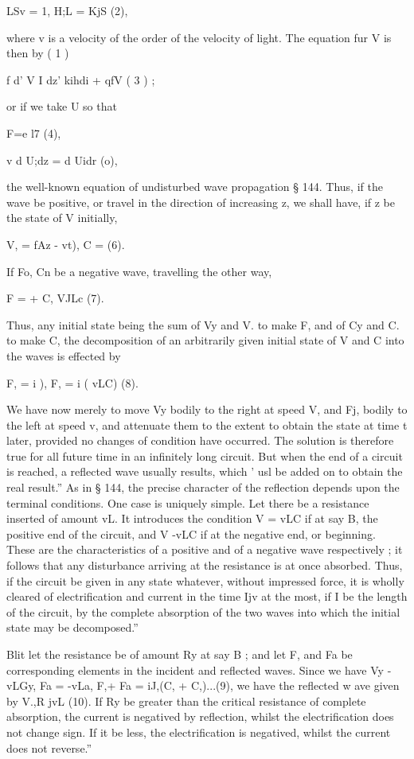 LSv = 1, H;L = KjS (2),

where v is a velocity of the order of the velocity of light. The
equation fur V is then by ( 1 )

f d' V I dz' kihdi + qfV ( 3 ) ;

or if we take U so that

F=e l7 (4),

v d U;dz = d Uidr (o),

the well-known equation of undisturbed wave propagation § 144.
Thus, if the wave be positive, or travel in the direction of
increasing z, we shall have, if z be the state of V initially,

V, = fAz - vt), C =  (6).

If Fo, Cn be a negative wave, travelling the other way,

F = + C, VJLc (7).



Thus, any initial state being the sum of Vy and V. to make F,
and of Cy and C. to make C, the decomposition of an arbitrarily
given initial state of V and C into the waves is effected by

F, = i ), F, = i ( vLC) (8).

We have now merely to move Vy bodily to the right at speed
V, and Fj, bodily to the left at speed v, and attenuate them to the
extent to obtain the state at time t later, provided no changes
of condition have occurred. The solution is therefore true for all
future time in an infinitely long circuit. But when the end of a
circuit is reached, a reflected wave usually results, which ' usl be
added on to obtain the real result.”
As in § 144, the precise character of the reflection depends
upon the terminal conditions. One case is uniquely simple.
Let there be a resistance inserted of amount vL. It introduces
the condition V = vLC if at say B, the positive end of the circuit,
and V -vLC if at the negative end, or beginning. These are
the characteristics of a positive and of a negative wave respectively ; it
follows that any disturbance arriving at the resistance is
at once absorbed. Thus, if the circuit be given in any state
whatever, without impressed force, it is wholly cleared of electrification and
current in the time Ijv at the most, if I be the length
of the circuit, by the complete absorption of the two waves into
which the initial state may be decomposed.”

 Blit let the resistance be of amount Ry at say B ; and let F,
and Fa be corresponding elements in the incident and reflected
waves. Since we have
Vy -vLGy, Fa = -vLa,
F,+ Fa = iJ,(C, + C,)...(9),
we have the reflected w ave given by
V.,R jvL
(10).
If Ry be greater than the critical resistance of complete absorption, the
current is negatived by reflection, whilst the electrification does not change
sign. If it be less, the electrification is
negatived, whilst the current does not reverse.”

